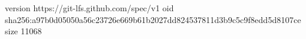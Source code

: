 version https://git-lfs.github.com/spec/v1
oid sha256:a97b0d05050a56c23726e669b61b2027dd824537811d3b9c5c9f8edd5d8107ce
size 11068
